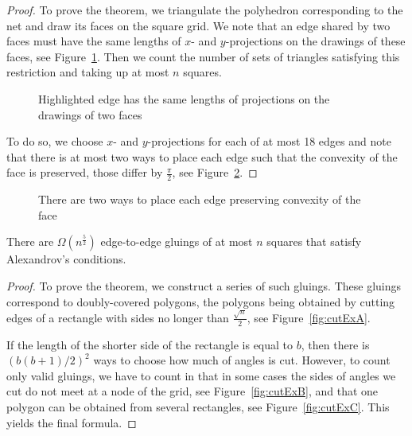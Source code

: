 \documentclass[a4paper,USenglish,cleveref, autoref, thm-restate]{socg-lipics-v2019}
\begin{document}
\begin{proof} To prove the theorem, we triangulate the polyhedron corresponding to the net and draw its faces on the square grid. We note that an edge shared by two faces must have the same lengths of $x$- and $y$-projections on the drawings of these faces, see Figure~\ref{fig:edgesMeeting}. Then we count the number of sets of triangles satisfying this restriction and taking up at most $n$ squares.

\begin{figure}[h] \centering
{}\hspace{1.2cm}
\caption{Highlighted edge has the same lengths of projections on the drawings of two faces}
\label{fig:edgesMeeting}
\end{figure}

To do so, we choose $x$- and $y$-projections for each of at most 18 edges and note that there is at most two ways to place each edge such that the convexity of the face is preserved, those differ by $\frac{\pi}{2}$, see Figure~\ref{fig:twoWays}. \end{proof}

\begin{figure}[h] \centering
{}
\caption{There are two ways to place each edge preserving convexity of the face}
\label{fig:twoWays}
\end{figure}

\begin{theorem} \label{thm:n52}
	There are $\Omega \left( n^{\frac52} \right)$ edge-to-edge gluings of at most $n$ squares that satisfy Alexandrov's conditions.
\end{theorem}

\begin{proof} To prove the theorem, we construct a series of such gluings. These gluings correspond to doubly-covered polygons, the polygons being obtained by cutting edges of a rectangle with sides no longer than $\frac{\sqrt{n}}{2}$, see Figure~\ref{fig:cutExA}.



If the length of the shorter side of the rectangle is equal to $b$, then there is $\left( b(b+1) / 2 \right)^2$ ways to choose how much of angles is cut. However, to count only valid gluings, we have to count in that in some cases the sides of angles we cut do not meet at a node of the grid, see Figure~\ref{fig:cutExB}, and that one polygon can be obtained from several rectangles, see Figure~\ref{fig:cutExC}. This yields the final formula.\end{proof}
\end{document}
